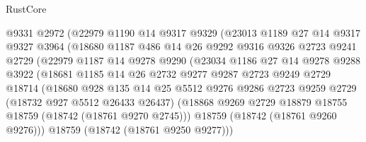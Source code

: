 \begin{lexlean}{RustCore}
\begin{coremodule}
                    @9331
                    @2972
                    (@22979
                      @1190
                      @14
                      @9317
                      @9329
                      (@23013
                        @1189
                        @27
                        @14
                        @9317
                        @9327
                        @3964
                        (@18680
                          @1187
                          @486
                          @14
                          @26
                          @9292
                          @9316
                          @9326
                          @2723
                          @9241
                          @2729
                          (@22979
                            @1187
                            @14
                            @9278
                            @9290
                            (@23034
                              @1186
                              @27
                              @14
                              @9278
                              @9288
                              @3922
                              (@18681
                                @1185
                                @14
                                @26
                                @2732
                                @9277
                                @9287
                                @2723
                                @9249
                                @2729
                                @18714
                                (@18680
                                  @928
                                  @135
                                  @14
                                  @25
                                  @5512
                                  @9276
                                  @9286
                                  @2723
                                  @9259
                                  @2729
                                  (@18732 @927 @5512 @26433 @26437)
                                  (@18868
                                    @9269
                                    @2729
                                    @18879
                                    @18755
                                    @18759
                                    (@18742 (@18761 @9270 @2745)))
                                  @18759
                                  (@18742 (@18761 @9260 @9276)))
                                @18759
                                (@18742 (@18761 @9250 @9277)))

\end{coremodule}
\end{lexlean}
